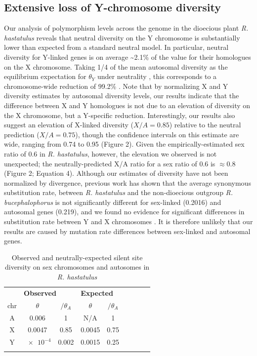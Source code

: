 \documentclass[9pt,twocolumn,twoside]{gsajnl}
\begin{document}
\subsection*{Extensive loss of Y-chromosome diversity}
Our analysis of polymorphism levels across the genome in the dioecious plant \textit{R. hastatulus} reveals that neutral diversity on the Y chromosome is substantially lower than expected from a standard neutral model. In particular, neutral diversity for Y-linked genes is on average \textasciitilde 2.1\% of the value for their homologues on the X chromosome. Taking 1/4 of the mean autosomal diversity as the equilibrium expectation for $\theta_{Y}$ under neutrality \citep{wright1931evolution}, this corresponds to a chromosome-wide reduction of 99.2\% . Note that by normalizing X and Y diversity estimates by autosomal diversity levels, our results indicate that the difference between X and Y homologues is not due to an elevation of diversity on the X chromosome, but a Y-specific reduction. Interestingly, our results also suggest an elevation of X-linked diversity ($X/A=0.85$) relative to the neutral prediction ($X/A=0.75$), though the confidence intervals on this estimate are wide, ranging from 0.74 to 0.95 (Figure 2). Given the empirically-estimated sex ratio of 0.6 in \textit{R. hastatulus}\citep{pickup2013influence}, however, the elevation we observed is not unexpected; the neutrally-predicted X/A ratio for a sex ratio of 0.6 is $\approx 0.8$ (Figure 2; Equation 4). Although our estimates of diversity have not been normalized by divergence, previous work has shown that the average synonymous substitution rate, between \textit{R. hastatulus} and the non-dioecious outgroup \textit{R. bucephalophorus} is not significantly different for sex-linked (0.2016) and autosomal genes (0.219), and we found no evidence for significant differences in substitution rate between Y and X chromosomes \citep{hough2014}. It is therefore unlikely that our results are caused by mutation rate differences between sex-linked and autosomal genes.

\begin{table}[htb]
\centering
\caption{Observed and neutrally-expected silent site diversity on sex chromosomes and autosomes in \textit{R. hastatulus}}
\begin{tabular}{ccccccccc}
\textbf{} & \multicolumn{2}{l}{\textbf{Observed}} & \multicolumn{3}{l}{\textbf{Expected}} \\

chr & $\theta$ & $/\theta_{A}$ & $\theta$ & $/\theta_{A}$  \\
\midrule
A & 0.006 & 1 & N/A & 1 \\
X & 0.0047 & 0.85 & 0.0045 & 0.75 \\
Y & $\num{e-4}$ & 0.002 & 0.0015 & 0.25 \\
\addlinespace

\bottomrule
\end{tabular}
\end{table}
\end{document}
